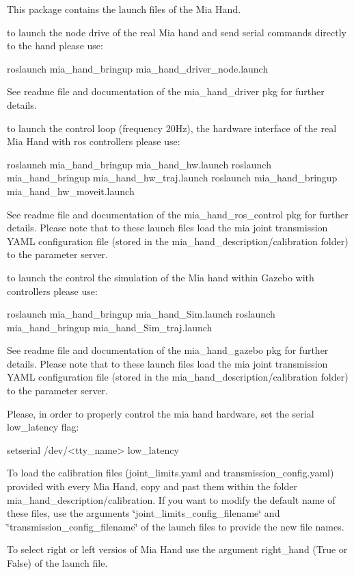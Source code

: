 This package contains the launch files of the Mia Hand.


\begin{DoxyItemize}
\item to launch the node drive of the real Mia hand and send serial commands directly to the hand please use\+: \begin{DoxyVerb}roslaunch mia_hand_bringup mia_hand_driver_node.launch
\end{DoxyVerb}


See readme file and documentation of the mia\+\_\+hand\+\_\+driver pkg for further details.
\item to launch the control loop (frequency 20Hz), the hardware interface of the real Mia Hand with ros controllers please use\+: \begin{DoxyVerb}roslaunch mia_hand_bringup mia_hand_hw.launch
roslaunch mia_hand_bringup mia_hand_hw_traj.launch
roslaunch mia_hand_bringup mia_hand_hw_moveit.launch
\end{DoxyVerb}


See readme file and documentation of the mia\+\_\+hand\+\_\+ros\+\_\+control pkg for further details. Please note that to these launch files load the mia joint transmission Y\+A\+ML configuration file (stored in the mia\+\_\+hand\+\_\+description/calibration folder) to the parameter server.
\item to launch the control the simulation of the Mia hand within Gazebo with controllers please use\+: \begin{DoxyVerb}  roslaunch mia_hand_bringup mia_hand_Sim.launch
  roslaunch mia_hand_bringup mia_hand_Sim_traj.launch
\end{DoxyVerb}


See readme file and documentation of the mia\+\_\+hand\+\_\+gazebo pkg for further details. Please note that to these launch files load the mia joint transmission Y\+A\+ML configuration file (stored in the mia\+\_\+hand\+\_\+description/calibration folder) to the parameter server.

Please, in order to properly control the mia hand hardware, set the serial low\+\_\+latency flag\+: \begin{DoxyVerb}  setserial /dev/<tty_name> low_latency
\end{DoxyVerb}


To load the calibration files (joint\+\_\+limits.\+yaml and transmission\+\_\+config.\+yaml) provided with every Mia Hand, copy and past them within the folder mia\+\_\+hand\+\_\+description/calibration. If you want to modify the default name of these files, use the arguments \char`\"{}joint\+\_\+limits\+\_\+config\+\_\+filename\char`\"{} and \char`\"{}transmission\+\_\+config\+\_\+filename\char`\"{} of the launch files to provide the new file names.

To select right or left versios of Mia Hand use the argument right\+\_\+hand (True or False) of the launch file. 
\end{DoxyItemize}